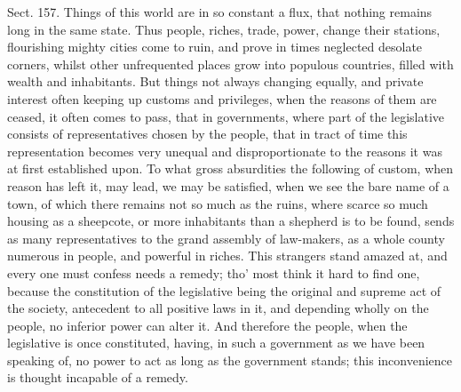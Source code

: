\documentclass[11pt,openany]{book}
\begin{document}
Sect. 157. Things of this world are in so constant a flux, that nothing remains long in the same state. Thus people, riches, trade, power, change their stations, flourishing mighty cities come to ruin, and prove in times neglected desolate corners, whilst other unfrequented places grow into populous countries, filled with wealth and inhabitants. But things not always changing equally, and private interest often keeping up customs and privileges, when the reasons of them are ceased, it often comes to pass, that in governments, where part of the legislative consists of representatives chosen by the people, that in tract of time this representation becomes very unequal and disproportionate to the reasons it was at first established upon. To what gross absurdities the following of custom, when reason has left it, may lead, we may be satisfied, when we see the bare name of a town, of which there remains not so much as the ruins, where scarce so much housing as a sheepcote, or more inhabitants than a shepherd is to be found, sends as many representatives to the grand assembly of law-makers, as a whole county numerous in people, and powerful in riches. This strangers stand amazed at, and every one must confess needs a remedy; tho' most think it hard to find one, because the constitution of the legislative being the original and supreme act of the society, antecedent to all positive laws in it, and depending wholly on the people, no inferior power can alter it. And therefore the people, when the legislative is once constituted, having, in such a government as we have been speaking of, no power to act as long as the government stands; this inconvenience is thought incapable of a remedy.
\end{document}
